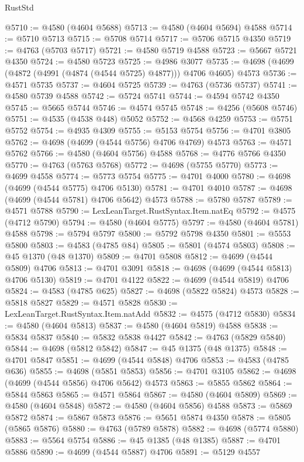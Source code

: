 \begin{lexlean}{RustStd}
\begin{coremodule}
@5710 := @4580 (@4604 @5688)
@5713 := @4580 (@4604 @5694) @4588
@5714 := @5710 @5713
@5715 := @5708 @5714
@5717 := @5706 @5715 @4350
@5719 := @4763 (@5703 @5717)
@5721 := @4580 @5719 @4588
@5723 := @5667 @5721 @4350
@5724 := @4580 @5723
@5725 := @4986 @3077
@5735 := @4698 (@4699 (@4872 (@4991 (@4874 (@4544 @5725) @4877))) @4706 @4605) @4573
@5736 := @4571 @5735
@5737 := @4604 @5725
@5739 := @4763 (@5736 @5737)
@5741 := @4580 @5739 @4588
@5742 := @5724 @5741
@5744 := @4594 @5742 @4350
@5745 := @5665 @5744
@5746 := @4574 @5745
@5748 := @4256 (@5608 @5746)
@5751 := @4535 (@4538 @448) @5052
@5752 := @4568 @4259
@5753 := @5751 @5752
@5754 := @4935 @4309
@5755 := @5153 @5754
@5756 := @4701 @3805
@5762 := @4698 (@4699 (@4544 @5756) @4706 @4769) @4573
@5763 := @4571 @5762
@5766 := @4580 (@4604 @5756) @4588
@5768 := @4776 @5766 @4350
@5770 := @4763 (@5763 @5768)
@5772 := @4698 (@5755 @5770)
@5773 := @4699 @4558
@5774 := @5773 @5754
@5775 := @4701 @4000
@5780 := @4698 (@4699 (@4544 @5775) @4706 @5130)
@5781 := @4701 @4010
@5787 := @4698 (@4699 (@4544 @5781) @4706 @5642) @4573
@5788 := @5780 @5787
@5789 := @4571 @5788
@5790 := LexLeanTarget.RustSyntax.Item.natEq
@5792 := @4575 (@4712 @5790)
@5794 := @4580 (@4604 @5775)
@5797 := @4580 (@4604 @5781) @4588
@5798 := @5794 @5797
@5800 := @5792 @5798 @4350
@5801 := @5553 @5800
@5803 := @4583 (@4785 @84)
@5805 := @5801 (@4574 @5803)
@5808 := @45 @1370 (@48 @1370)
@5809 := @4701 @5808
@5812 := @4699 (@4544 @5809) @4706
@5813 := @4701 @3091
@5818 := @4698 (@4699 (@4544 @5813) @4706 @5130)
@5819 := @4701 @4122
@5822 := @4699 (@4544 @5819) @4706
@5824 := @4583 (@4785 @625)
@5827 := @4698 (@5822 @5824) @4573
@5828 := @5818 @5827
@5829 := @4571 @5828
@5830 := LexLeanTarget.RustSyntax.Item.natAdd
@5832 := @4575 (@4712 @5830)
@5834 := @4580 (@4604 @5813)
@5837 := @4580 (@4604 @5819) @4588
@5838 := @5834 @5837
@5840 := @5832 @5838 @4427
@5842 := @4763 (@5829 @5840)
@5844 := @4698 (@5812 @5842)
@5847 := @45 @1375 (@48 @1375)
@5848 := @4701 @5847
@5851 := @4699 (@4544 @5848) @4706
@5853 := @4583 (@4785 @636)
@5855 := @4698 (@5851 @5853)
@5856 := @4701 @3105
@5862 := @4698 (@4699 (@4544 @5856) @4706 @5642) @4573
@5863 := @5855 @5862
@5864 := @5844 @5863
@5865 := @4571 @5864
@5867 := @4580 (@4604 @5809)
@5869 := @4580 (@4604 @5848)
@5872 := @4580 (@4604 @5856) @4588
@5873 := @5869 @5872
@5874 := @5867 @5873
@5876 := @5651 @5874 @4350
@5878 := @5805 (@5865 @5876)
@5880 := @4763 (@5789 @5878)
@5882 := @4698 (@5774 @5880)
@5883 := @5564 @5754
@5886 := @45 @1385 (@48 @1385)
@5887 := @4701 @5886
@5890 := @4699 (@4544 @5887) @4706
@5891 := @5129 @4557

\end{coremodule}
\end{lexlean}
